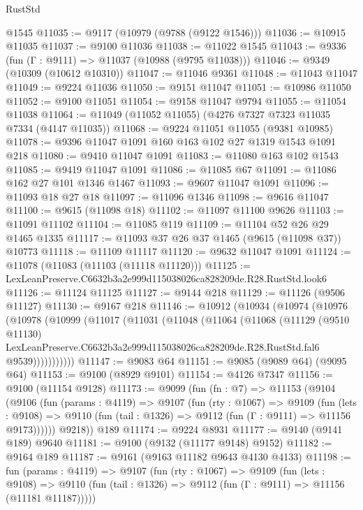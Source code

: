 \begin{lexlean}{RustStd}
\begin{coremodule}
    @1545
@11035 := @9117 (@10979 (@9788 (@9122 @1546)))
@11036 := @10915 @11035
@11037 := @9100 @11036
@11038 := @11022 @1545
@11043 := @9336 (fun (Γ : @9111) => @11037 (@10988 (@9795 @11038)))
@11046 := @9349 (@10309 (@10612 @10310))
@11047 := @11046 @9361
@11048 := @11043 @11047
@11049 := @9224 @11036
@11050 := @9151 @11047
@11051 := @10986 @11050
@11052 := @9100 @11051
@11054 := @9158 @11047 @9794
@11055 := @11054 @11038
@11064 := @11049 (@11052 @11055) (@4276 @7327 @7323 @11035 @7334 (@4147 @11035))
@11068 := @9224 @11051 @11055 (@9381 @10985)
@11078 := @9396 @11047 @1091 @160 @163 @102 @27 @1319 @1543 @1091 @218
@11080 := @9410 @11047 @1091
@11083 := @11080 @163 @102 @1543
@11085 := @9419 @11047 @1091
@11086 := @11085 @67
@11091 := @11086 @162 @27 @101 @1346 @1467
@11093 := @9607 @11047 @1091
@11096 := @11093 @18 @27 @18
@11097 := @11096 @1346
@11098 := @9616 @11047
@11100 := @9615 (@11098 @18)
@11102 := @11097 @11100 @9626
@11103 := @11091 @11102
@11104 := @11085 @119
@11109 := @11104 @52 @26 @29 @1465 @1335
@11117 := @11093 @37 @26 @37 @1465 (@9615 (@11098 @37)) @10773
@11118 := @11109 @11117
@11120 := @9632 @11047 @1091
@11124 := @11078 (@11083 (@11103 (@11118 @11120)))
@11125 := LexLeanPreserve.C6632b3a2e999d115038026ca828209de.R28.RustStd.look6
@11126 := @11124 @11125
@11127 := @9144 @218
@11129 := @11126 (@9506 @11127)
@11130 := @9167 @218
@11146 := @10912
    (@10934
      (@10974
        (@10976
          (@10978
            (@10999
              (@11017
                (@11031
                  (@11048
                    (@11064
                      (@11068
                        (@11129
                          (@9510 @11130)
                          LexLeanPreserve.C6632b3a2e999d115038026ca828209de.R28.RustStd.fal6
                          @9539)))))))))))
@11147 := @9083 @64
@11151 := @9085 (@9089 @64) (@9095 @64)
@11153 := @9100 (@8929 @9101)
@11154 := @4126 @7347
@11156 := @9100 (@11154 @9128)
@11173 := @9099
    (fun (fn : @7) =>
    @11153
      (@9104
        (@9106
          (fun (params : @4119) =>
          @9107
            (fun (rty : @1067) =>
            @9109
              (fun (lets : @9108) =>
              @9110 (fun (tail : @1326) => @9112 (fun (Γ : @9111) => @11156 @9173))))))
        @9218))
    @189
@11174 := @9224 @8931
@11177 := @9140 (@9141 @189) @9640
@11181 := @9100 (@9132 (@11177 @9148) @9152)
@11182 := @9164 @189
@11187 := @9161 (@9163 @11182 @9643 @4130 @4133)
@11198 := fun (params : @4119) =>
  @9107
    (fun (rty : @1067) =>
    @9109
      (fun (lets : @9108) =>
      @9110 (fun (tail : @1326) => @9112 (fun (Γ : @9111) => @11156 (@11181 @11187)))))

\end{coremodule}
\end{lexlean}
